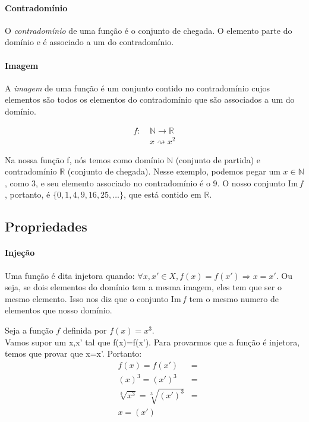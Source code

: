 \paragraph*{Contradomínio}
O \emph{contradomínio} de uma função é o conjunto de chegada. O elemento parte do domínio e é associado a um do contradomínio.
\paragraph*{Imagem}
A \emph{imagem} de uma função é um conjunto contido no contradomínio cujos elementos são todos os elementos do contradomínio que são associados a um do domínio.\\
\begin{exemplo}
\begin{align*}
f: \ &\mathbb{N} \rightarrow \mathbb{R} \\
&x \rightsquigarrow x^2
\end{align*}
\end{exemplo}
Na nossa função f, nós temos como domínio $\mathbb{N}$ (conjunto de partida) e contradomínio $\mathbb{R}$ (conjunto de chegada). Nesse exemplo, podemos pegar um $x \in \mathbb{N}$, como 3, e seu elemento associado no contradomínio é o 9. O nosso conjunto $\textrm{Im} \, f$, portanto, é $\{0,1,4,9,16,25,\ldots\}$, que está contido em $\mathbb{R}$.

\subsection{Propriedades}
\paragraph{Injeção} Uma função é dita injetora quando: $\forall x,x'\in X, f(x)=f(x') \Rightarrow x=x'$. Ou seja, se dois elementos do domínio tem a mesma imagem, eles tem que ser o mesmo elemento. Isso nos diz que o conjunto $\textrm{Im} \,f$ tem o mesmo numero de elementos que nosso domínio.\\
\begin{exemplo}Seja a função $f$ definida por $f(x)=x^3$.\\
Vamos supor um x,x' tal que f(x)=f(x'). Para provarmos que a função é injetora, temos que provar que x=x'. Portanto:
\begin{align*}
&f(x)=f(x') &=\\
&(x)^3=(x')^3 &=\\
&\sqrt[3]{x^3}=\sqrt[3]{(x')^3}&=\\
&x=(x')
\end{align*}
\end{exemplo}


